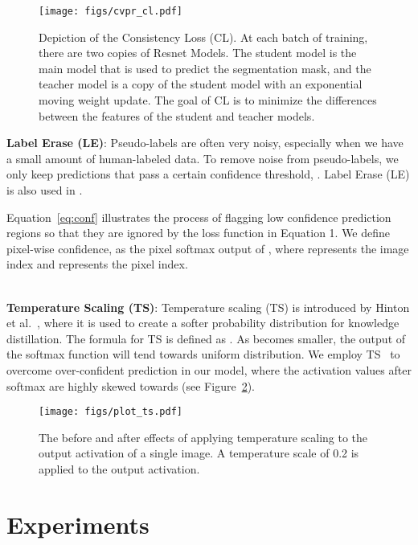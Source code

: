 \documentclass[10pt, conference, compsocconf]{IEEEtran}
\begin{document}
\begin{figure}[htb]
  \centering
  \texttt{[image: figs/cvpr\_cl.pdf]}
  \caption{Depiction of the Consistency Loss (CL). At each batch of training, there are two copies of Resnet Models. The student model is the main model that is used to predict the segmentation mask, and the teacher model is a copy of the student model with an exponential moving weight update.  The goal of CL is to minimize the differences between the features of the student and teacher models.}
  \label{fig:cl}
\end{figure}



\noindent\textbf{Label Erase (LE)}:
Pseudo-labels are often very noisy, especially when we have a small amount of human-labeled data.
To remove noise from pseudo-labels, we only keep predictions that pass a certain confidence threshold, . 
Label Erase (LE) is also used in \cite{mittal2019semi,olsson2020classmix,radosavovic2018data,zoph2020rethinking}. 




Equation~\ref{eq:conf} illustrates the process of flagging low confidence prediction regions so that they are ignored by the loss function in Equation 1. We define pixel-wise confidence,  as the pixel softmax output of , where  represents the image index and  represents the pixel index.



 \\

\noindent\textbf{Temperature Scaling (TS)}:
Temperature scaling (TS) is introduced by Hinton et al.~\cite{hinton2015distilling}, where it is used to create a softer probability distribution for knowledge distillation. The formula for TS is defined as 
. As  becomes smaller, the output of the softmax function will tend towards uniform distribution. 
We employ TS~\cite{hinton2015distilling} to overcome over-confident prediction in our model, where the activation values after softmax are highly skewed towards  (see Figure~\ref{fig:ts}).

\begin{figure}[htb]
  \centering
  \texttt{[image: figs/plot\_ts.pdf]}
  \caption{The before and after effects of applying temperature scaling to the output activation of a single image. A temperature scale of 0.2 is applied to the output activation.
  }
  \label{fig:ts}
\end{figure}

\section{Experiments}\label{sec:experiment}
\end{document}
